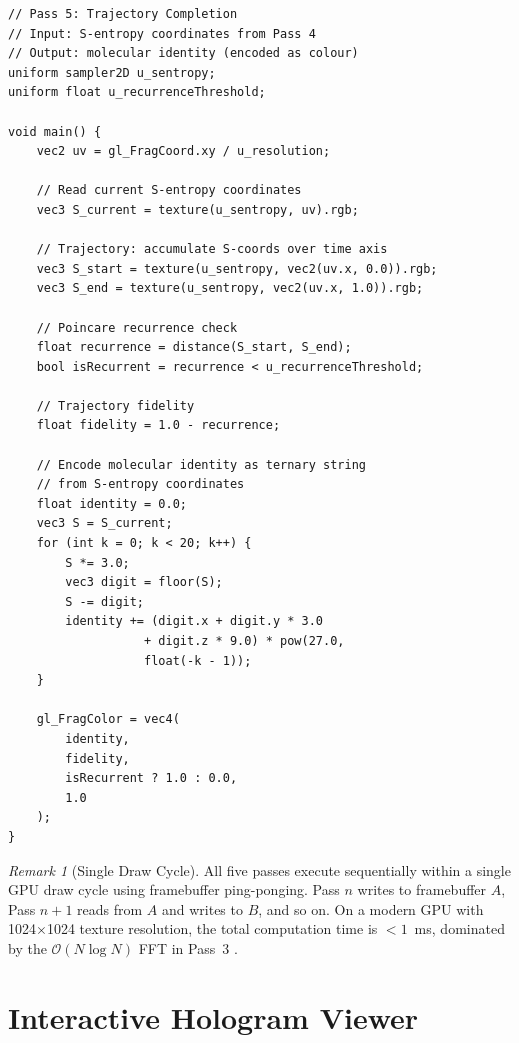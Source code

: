 \documentclass[11pt,twocolumn,a4paper]{article}
\theoremstyle{definition}
\theoremstyle{remark}
\newtheorem{remark}[theorem]{Remark}
\begin{document}
\begin{lstlisting}[style=glsl, caption={Pass 5: Trajectory completion shader}, label={lst:pass5}]
// Pass 5: Trajectory Completion
// Input: S-entropy coordinates from Pass 4
// Output: molecular identity (encoded as colour)
uniform sampler2D u_sentropy;
uniform float u_recurrenceThreshold;

void main() {
    vec2 uv = gl_FragCoord.xy / u_resolution;

    // Read current S-entropy coordinates
    vec3 S_current = texture(u_sentropy, uv).rgb;

    // Trajectory: accumulate S-coords over time axis
    vec3 S_start = texture(u_sentropy, vec2(uv.x, 0.0)).rgb;
    vec3 S_end = texture(u_sentropy, vec2(uv.x, 1.0)).rgb;

    // Poincare recurrence check
    float recurrence = distance(S_start, S_end);
    bool isRecurrent = recurrence < u_recurrenceThreshold;

    // Trajectory fidelity
    float fidelity = 1.0 - recurrence;

    // Encode molecular identity as ternary string
    // from S-entropy coordinates
    float identity = 0.0;
    vec3 S = S_current;
    for (int k = 0; k < 20; k++) {
        S *= 3.0;
        vec3 digit = floor(S);
        S -= digit;
        identity += (digit.x + digit.y * 3.0
                   + digit.z * 9.0) * pow(27.0,
                   float(-k - 1));
    }

    gl_FragColor = vec4(
        identity,
        fidelity,
        isRecurrent ? 1.0 : 0.0,
        1.0
    );
}
\end{lstlisting}

\begin{remark}[Single Draw Cycle]
All five passes execute sequentially within a single GPU draw cycle using framebuffer ping-ponging. Pass $n$ writes to framebuffer $A$, Pass $n+1$ reads from $A$ and writes to $B$, and so on. On a modern GPU with 1024$\times$1024 texture resolution, the total computation time is $< 1$~ms, dominated by the $\mathcal{O}(N \log N)$ FFT in Pass~3 \citep{cooleytukey1965}.
\end{remark}

\section{Interactive Hologram Viewer}
\label{sec:viewer}
\end{document}

